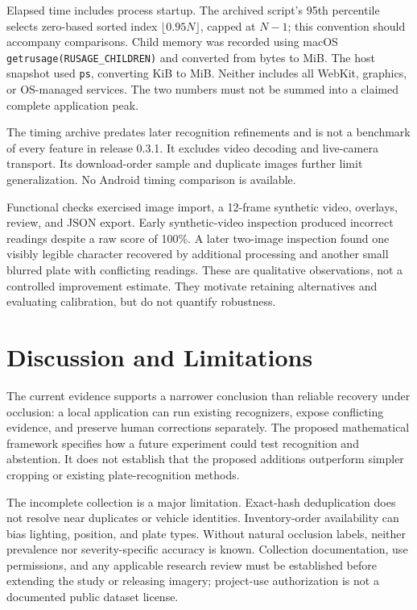 \documentclass[journal]{IEEEtran}
\begin{document}
Elapsed time includes process startup. The archived script's 95th percentile selects zero-based sorted index $\lfloor0.95N\rfloor$, capped at $N-1$; this convention should accompany comparisons. Child memory was recorded using macOS \texttt{getrusage(RUSAGE\_CHILDREN)} and converted from bytes to MiB. The host snapshot used \texttt{ps}, converting KiB to MiB. Neither includes all WebKit, graphics, or OS-managed services. The two numbers must not be summed into a claimed complete application peak.

The timing archive predates later recognition refinements and is not a benchmark of every feature in release 0.3.1. It excludes video decoding and live-camera transport. Its download-order sample and duplicate images further limit generalization. No Android timing comparison is available.

Functional checks exercised image import, a 12-frame synthetic video, overlays, review, and JSON export. Early synthetic-video inspection produced incorrect readings despite a raw score of 100\%. A later two-image inspection found one visibly legible character recovered by additional processing and another small blurred plate with conflicting readings. These are qualitative observations, not a controlled improvement estimate. They motivate retaining alternatives and evaluating calibration, but do not quantify robustness.

\section{Discussion and Limitations}\label{sec:discussion}
The current evidence supports a narrower conclusion than reliable recovery under occlusion: a local application can run existing recognizers, expose conflicting evidence, and preserve human corrections separately. The proposed mathematical framework specifies how a future experiment could test recognition and abstention. It does not establish that the proposed additions outperform simpler cropping or existing plate-recognition methods.

The incomplete collection is a major limitation. Exact-hash deduplication does not resolve near duplicates or vehicle identities. Inventory-order availability can bias lighting, position, and plate types. Without natural occlusion labels, neither prevalence nor severity-specific accuracy is known. Collection documentation, use permissions, and any applicable research review must be established before extending the study or releasing imagery; project-use authorization is not a documented public dataset license.
\end{document}
